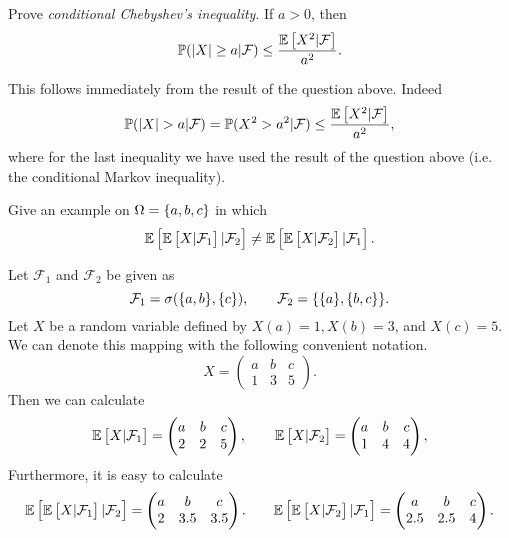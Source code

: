 \begin{problem}
	Prove \emph{conditional Chebyshev's inequality}. If $ a>0 $, then
	\[ \mathbb{P}(\left|X\right|\geq a|\mathcal{F}) \leq \frac{\mathbb{E}\left[X^2|\mathcal{F}\right]}{a^2}. \]
\end{problem}
\begin{solution}
	This follows immediately from the result of the question above. Indeed
	\[ \prob(\abs{X}>a|\mathcal{F}) = \prob(X^2>a^2|\mathcal{F}) \leq \frac{\E{X^2|\mathcal{F}}}{a^2}, \]
	where for the last inequality we have used the result of the question above (i.e. the conditional Markov inequality).
\end{solution}

\begin{problem}
	Give an example on $ \Omega = \{a,b,c\} $ in which 
	\[ \mathbb{E}\left[\mathbb{E}\left[X|\mathcal{F}_1\right]|\mathcal{F}_2\right] \neq \mathbb{E}\left[\mathbb{E}\left[X|\mathcal{F}_2\right]|\mathcal{F}_1\right]. \]
\end{problem}
\begin{solution}
	Let $ \mathcal{F}_1 $ and $ \mathcal{F}_2 $ be given as
	\[ \mathcal{F}_1 = \sigma(\{a,b\},\{c\}), \qquad \mathcal{F}_2 = \{\{a\},\{b,c\}\}. \]
	Let $ X $ be a random variable defined by $ X(a) = 1, X(b) = 3$, and $ X(c) = 5 $. We can denote this mapping with the following convenient notation.
	\[ X = \begin{pmatrix}
		a & b & c \\
		1 & 3 & 5
	\end{pmatrix}. \]
	Then we can calculate
	\[ \mathbb{E}\left[X|\mathcal{F}_1\right] = \begin{pmatrix}
		a & b & c \\
		2 & 2&  5
	\end{pmatrix}, \qquad 
	\mathbb{E}\left[X|\mathcal{F}_2\right] = \begin{pmatrix}
		a & b & c \\
		1 & 4 & 4 
	\end{pmatrix}, \]
	Furthermore, it is easy to calculate
	\[ \mathbb{E}\left[\mathbb{E}\left[X|\mathcal{F}_1\right]|\mathcal{F}_2\right] = \begin{pmatrix}
		a & b & c \\
		2 & 3.5 & 3.5
	\end{pmatrix}. \qquad
	\mathbb{E}\left[\mathbb{E}\left[X|\mathcal{F}_2\right]|\mathcal{F}_1\right] = \begin{pmatrix}
		a & b & c \\
		2.5 & 2.5 & 4
	\end{pmatrix}. \]
\end{solution}

